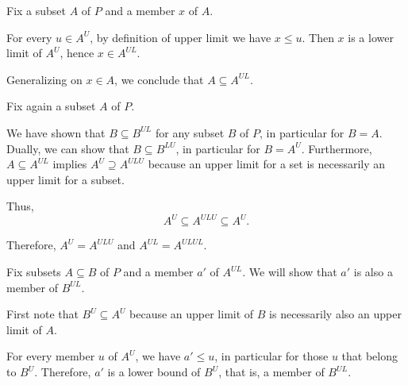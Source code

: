 \begin{defproof}
   Fix a subset \( A \) of \( P \) and a member \( x \) of \( A \).

  For every \( u \in A^U \), by definition of upper limit we have \( x \leq u \). Then \( x \) is a lower limit of \( A^U \), hence \( x \in A^{UL} \).

  Generalizing on \( x \in A \), we conclude that \( A \subseteq A^{UL} \).

   Fix again a subset \( A \) of \( P \).

  We have shown that \( B \subseteq B^{UL} \) for any subset \( B \) of \( P \), in particular for \( B = A \). Dually, we can show that \( B \subseteq B^{LU} \), in particular for \( B = A^U \). Furthermore, \( A \subseteq A^{UL} \) implies \( A^U \supseteq A^{ULU} \) because an upper limit for a set is necessarily an upper limit for a subset.

  Thus,
  \begin{equation*}
    A^U \subseteq A^{ULU} \subseteq A^U.
  \end{equation*}

  Therefore, \( A^U = A^{ULU} \) and \( A^{UL} = A^{ULUL} \).

   Fix subsets \( A \subseteq B \) of \( P \) and a member \( a' \) of \( A^{UL} \). We will show that \( a' \) is also a member of \( B^{UL} \).

  First note that \( B^U \subseteq A^U \) because an upper limit of \( B \) is necessarily also an upper limit of \( A \).

  For every member \( u \) of \( A^U \), we have \( a' \leq u \), in particular for those \( u \) that belong to \( B^U \). Therefore, \( a' \) is a lower bound of \( B^U \), that is, a member of \( B^{UL} \).
\end{defproof}


